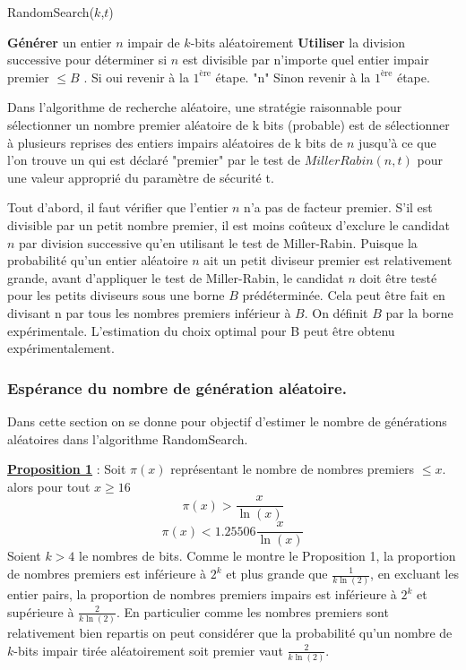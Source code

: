 \begin{algorithm}
\caption{RandomSearch($k$,$t$)}
\begin{algorithmic}[1]
\State \textbf{Générer} un entier $n$ impair de $k$-bits aléatoirement
\State \textbf{Utiliser} la division successive pour déterminer si $n$ est divisible par n'importe quel entier impair premier $\leq B$ . Si oui revenir à la $1^{\text{ère}}$ étape.
 \Return "n" Sinon revenir à la $1^{\text{ère}}$ étape.
\EndIf
\end{algorithmic}
\end{algorithm}
Dans l'algorithme de recherche aléatoire, une stratégie raisonnable \label{raisonnable} pour sélectionner un nombre premier aléatoire de k bits (probable) est de sélectionner à plusieurs reprises des entiers impairs aléatoires de k bits de $n$ jusqu'à ce que l'on trouve un qui est déclaré "premier" par le test de $Miller Rabin(n,t)$ pour une valeur approprié du paramètre de sécurité t.

Tout d'abord, il faut vérifier que l'entier $n$ n'a pas de facteur premier. S'il est divisible par un petit nombre premier, il est moins coûteux d'exclure le candidat $n$ par division successive qu'en utilisant le test de Miller-Rabin.
Puisque la probabilité qu'un entier aléatoire $n$ ait un petit diviseur premier est relativement grande, avant d'appliquer le test de Miller-Rabin, le candidat $n$ doit être testé pour les petits diviseurs sous une borne $B$ prédéterminée. Cela peut être fait en divisant n par tous les nombres premiers inférieur à $B$.
On définit $B$ par la borne expérimentale. L'estimation du choix optimal pour B peut être obtenu expérimentalement.

\subsubsection{Espérance du nombre de génération aléatoire.}
Dans cette section on se donne pour objectif d’estimer le nombre de générations aléatoires dans l’algorithme RandomSearch.

\label{fait1}
\underline{\textbf{Proposition 1}} : Soit $\pi(x)$ représentant le nombre de nombres premiers $\leq x$. alors pour tout $x \geq 16$ 
$$\pi(x) > \dfrac{x}{\ln(x)}$$
$$\pi(x) < 1.25506\dfrac{x}{\ln(x)}$$
Soient $k>4$ le nombres de bits.
Comme le montre le Proposition 1, la proportion de nombres premiers est inférieure à $2^k$ et plus grande que $\frac{1}{k\ln(2)}$, en excluant les entier pairs, la proportion de nombres premiers impairs est inférieure à $2^k$ et supérieure à $\frac{2}{k\ln(2)}$. En particulier comme les nombres premiers sont relativement bien repartis on peut considérer que la probabilité qu’un nombre de $k$-bits impair tirée aléatoirement soit premier vaut $\frac{2}{k\ln(2)}$.

